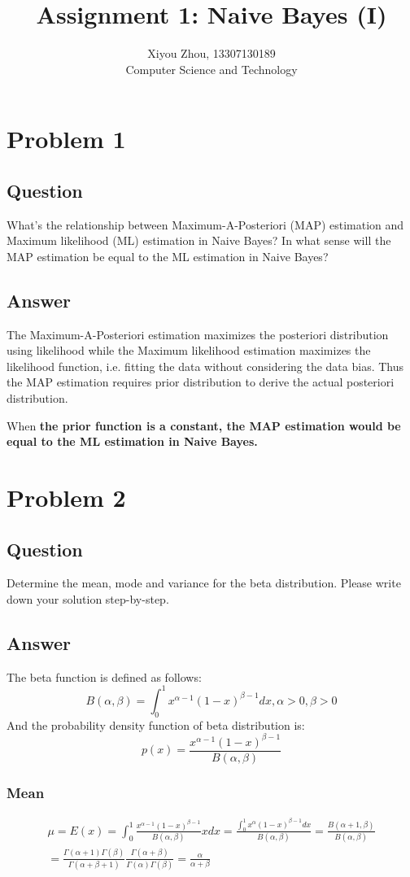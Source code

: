 \documentclass[11pt, oneside]{article}
\begin{document}
\title{Assignment 1: Naive Bayes (I)}
\author{Xiyou Zhou, 13307130189 \\ Computer Science and Technology}
\maketitle
\section{Problem 1}
\subsection{Question}
What's the relationship between Maximum-A-Posteriori (MAP) estimation and Maximum likelihood (ML) estimation in Naive Bayes? In what sense will the MAP estimation be equal to the ML estimation in Naive Bayes?
\subsection{Answer}
The Maximum-A-Posteriori estimation maximizes the posteriori distribution using likelihood while the Maximum likelihood estimation maximizes the likelihood function, i.e. fitting the data without considering the data bias. Thus the MAP estimation requires prior distribution to derive the actual posteriori distribution.

When \bf the prior function is a constant\rm, the MAP estimation would be equal to the ML estimation in Naive Bayes.

\section{Problem 2}
\subsection{Question}
Determine the mean, mode and variance for the beta distribution. Please write down your solution step-by-step.
\subsection{Answer}
The beta function is defined as follows:
$$B(\alpha, \beta) = \int_{0}^{1}{x^{\alpha-1}(1-x)^{\beta-1}}dx, \alpha > 0, \beta > 0$$
And the probability density function of beta distribution is:
$$p(x) = \frac{x^{\alpha-1}(1-x)^{\beta-1}}{B(\alpha, \beta)}$$
\subsubsection{Mean}
\begin{equation*}
\begin{multlined}
\mu=E(x)=\int_{0}^{1}{\frac{x^{\alpha-1}(1-x)^{\beta-1}}{B(\alpha, \beta)}xdx}=\frac{\int_0^1{x^\alpha(1-x)^{\beta-1}}dx}{B(\alpha, \beta)}=\frac{B(\alpha+1, \beta)}{B(\alpha, \beta)}\\
=\frac{\Gamma(\alpha+1)\Gamma(\beta)}{\Gamma(\alpha+\beta+1)}\frac{\Gamma(\alpha+\beta)}{\Gamma(\alpha)\Gamma(\beta)}=\frac{\alpha}{\alpha+\beta}
\end{multlined}
\end{equation*}
\end{document}

